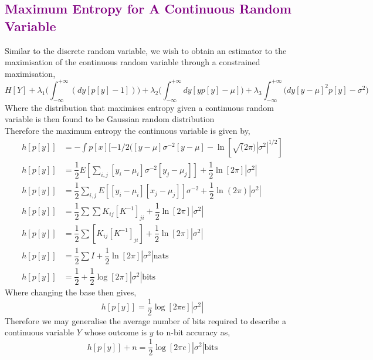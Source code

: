 \documentclass[7pt]{article}
\begin{document}

\subsection*{\textcolor{purple}{Maximum Entropy for A Continuous Random Variable}}

Similar to the discrete random variable, we wish to obtain an estimator to the maximisation of the continuous random variable through a constrained maximisation,
$$
H[Y] +\lambda_1 \Biggr(  \int_{-\infty}^{+\infty} (dy [p[y] - 1]) \Biggl) + \lambda_2 \Biggr(  \int_{-\infty}^{+\infty} dy [y p[y]  - \mu] \Biggl) + \lambda_3  \int_{-\infty}^{+\infty} \Biggr( dy [ y - \mu]^2 p[y]  - \sigma^2 \Biggl)
$$
Where the distribution that maximises entropy given a continuous random variable is then found to be Gaussian random distribution
\begin{equation}
\end{equation}
Therefore the maximum entropy  the continuous  variable is given by,
\begin{equation}
\begin{split}
h[p[y]] & = - \int p[x] [ -1/2 ([y - \mu] \sigma^{-2}  [y - \mu] - \ln [\sqrt(2 \pi) |\sigma^2|^{1/2}] \\
h[p[y]] & = \dfrac{1}{2} E [ \sum_{i,j} [y_i - \mu_i] \sigma^{-2}[y_j- \mu_j]] +\dfrac{1}{2} \ln[2 \pi] |\sigma^2| \\
h[p[y]] & = \dfrac{1}{2} \sum_{i,j} E [  [y_i - \mu_i] [x_j- \mu_j]]\sigma^{-2}  +\dfrac{1}{2} \ln(2 \pi) |\sigma^2| \\
h[p[y]] &= \dfrac{1}{2} \sum \sum K_{ij} [K^{-1}]_{ji} + \dfrac{1}{2} \ln [2 \pi] | \sigma^2 | \\
h[p[y]] & = \dfrac{1}{2} \sum [ K_{ij} [K^{-1}]_{ji} ] + \dfrac{1}{2} \ln [2 \pi] | \sigma^2 | \\
h[p[y]] &= \dfrac{1}{2} \sum I + \dfrac{1}{2} \ln [2 \pi] | \sigma^2 | \text{nats} \\
h[p[y]] &= \dfrac{1}{2} + \dfrac{1}{2} \log [2 \pi] | \sigma^2 | \text{bits}
\end{split}
\end{equation}
Where changing the base then gives,
$$
h[p[y]] = \dfrac{1}{2} \log [2 \pi e] | \sigma^2 |
$$
Therefore we may generalise the average number of bits required to describe a continuous variable $Y$ whose outcome is $y$ to n-bit accuracy as,
$$
h[p[y]]  + n  =  \dfrac{1}{2} \log [2 \pi e] | \sigma^2 | \text{bits}
$$
\end{document}
